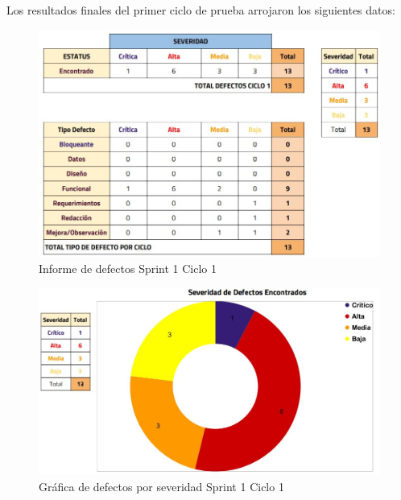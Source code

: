 \newpage

Los resultados finales del primer ciclo de prueba arrojaron los siguientes datos:

\begin{figure}[H]
	\begin{center}
		\includegraphics[width=.95\textwidth]{images/pruebas/s1c1}
		\caption{Informe de defectos Sprint 1 Ciclo 1}
		\label{fig:infos1c1}
	\end{center}
\end{figure}

\newpage

\begin{figure}[H]
	\begin{center}
		\includegraphics[width=.85\textwidth]{images/pruebas/s1c1-1}
		\caption{Gráfica de defectos por severidad Sprint 1 Ciclo 1}
		\label{fig:infos1c1-1}
	\end{center}
\end{figure}

